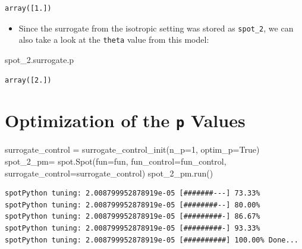 \documentclass[
  letterpaper,
  DIV=11,
  numbers=noendperiod]{scrreprt}
\newenvironment{Shaded}{\begin{snugshade}}{\end{snugshade}}
\newcommand{\DecValTok}[1]{\textcolor[rgb]{0.68,0.00,0.00}{#1}}
\newcommand{\NormalTok}[1]{\textcolor[rgb]{0.00,0.23,0.31}{#1}}
\newcommand{\OperatorTok}[1]{\textcolor[rgb]{0.37,0.37,0.37}{#1}}
\newcommand{\VariableTok}[1]{\textcolor[rgb]{0.07,0.07,0.07}{#1}}
\providecommand{\tightlist}{%
  \setlength{\itemsep}{0pt}\setlength{\parskip}{0pt}}\usepackage{longtable,booktabs,array}
\begin{document}
\begin{verbatim}
array([1.])
\end{verbatim}

\begin{itemize}
\tightlist
\item
  Since the surrogate from the isotropic setting was stored as
  \texttt{spot\_2}, we can also take a look at the \texttt{theta} value
  from this model:
\end{itemize}

\begin{Shaded}
\begin{Highlighting}[]
\NormalTok{spot\_2.surrogate.p}
\end{Highlighting}
\end{Shaded}

\begin{verbatim}
array([2.])
\end{verbatim}

\section{\texorpdfstring{Optimization of the \texttt{p}
Values}{Optimization of the p Values}}\label{optimization-of-the-p-values}

\begin{Shaded}
\begin{Highlighting}[]
\NormalTok{surrogate\_control }\OperatorTok{=}\NormalTok{ surrogate\_control\_init(n\_p}\OperatorTok{=}\DecValTok{1}\NormalTok{,}
\NormalTok{                                           optim\_p}\OperatorTok{=}\VariableTok{True}\NormalTok{)}
\NormalTok{spot\_2\_pm}\OperatorTok{=}\NormalTok{ spot.Spot(fun}\OperatorTok{=}\NormalTok{fun,}
\NormalTok{                    fun\_control}\OperatorTok{=}\NormalTok{fun\_control,}
\NormalTok{                    surrogate\_control}\OperatorTok{=}\NormalTok{surrogate\_control)}
\NormalTok{spot\_2\_pm.run()}
\end{Highlighting}
\end{Shaded}

\begin{verbatim}
spotPython tuning: 2.008799952878919e-05 [#######---] 73.33% 
spotPython tuning: 2.008799952878919e-05 [########--] 80.00% 
spotPython tuning: 2.008799952878919e-05 [#########-] 86.67% 
spotPython tuning: 2.008799952878919e-05 [#########-] 93.33% 
spotPython tuning: 2.008799952878919e-05 [##########] 100.00% Done...
\end{verbatim}
\end{document}
